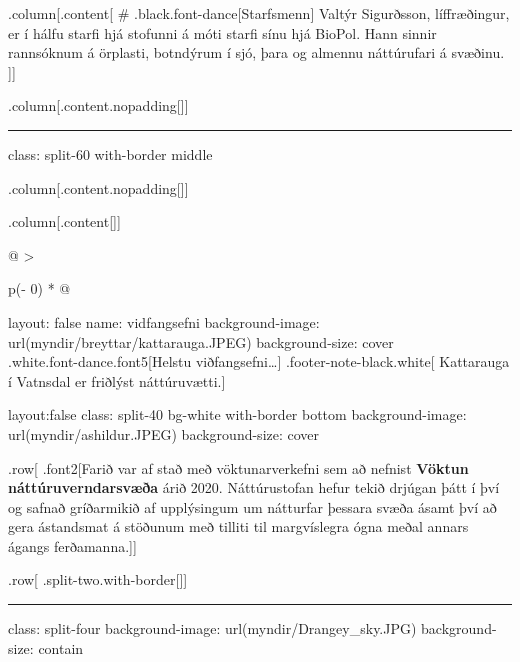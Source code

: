 \documentclass[
]{article}
\begin{document}
.column{[}.content{[} \# .black.font-dance{[}Starfsmenn{]} Valtýr
Sigurðsson, líffræðingur, er í hálfu starfi hjá stofunni á móti starfi
sínu hjá BioPol. Hann sinnir rannsóknum á örplasti, botndýrum í sjó,
þara og almennu náttúrufari á svæðinu. {]}{]}

.column{[}.content.nopadding{[}{]}{]}

\begin{center}\rule{0.5\linewidth}{0.5pt}\end{center}

class: split-60 with-border middle

.column{[}.content.nopadding{[}{]}{]}

.column{[}.content{[}{]}{]}

\begin{longtable}[]{@{}
  >{\raggedright\arraybackslash}p{(\columnwidth - 0\tabcolsep) * }@{}}
\toprule
\endhead
layout: false name: vidfangsefni background-image:
url(myndir/breyttar/kattarauga.JPEG) background-size: cover \\
.white.font-dance.font5{[}Helstu viðfangsefni\ldots{]}
.footer-note-black.white{[} Kattarauga í Vatnsdal er friðlýst
náttúruvætti.{]} \\
\bottomrule
\end{longtable}

layout:false class: split-40 bg-white with-border bottom
background-image: url(myndir/ashildur.JPEG) background-size: cover

.row{[} .font2{[}Farið var af stað með vöktunarverkefni sem að nefnist
\textbf{Vöktun náttúruverndarsvæða} árið 2020. Náttúrustofan hefur tekið
drjúgan þátt í því og safnað gríðarmikið af upplýsingum um nátturfar
þessara svæða ásamt því að gera ástandsmat á stöðunum með tilliti til
margvíslegra ógna meðal annars ágangs ferðamanna.{]}{]}

.row{[} .split-two.with-border{[}{]}{]}

\begin{center}\rule{0.5\linewidth}{0.5pt}\end{center}

class: split-four background-image: url(myndir/Drangey\_sky.JPG)
background-size: contain
\end{document}
